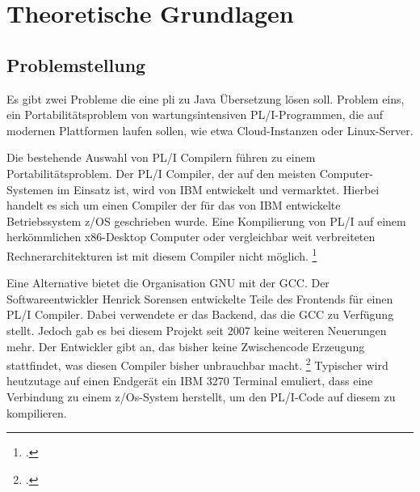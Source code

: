 




\section{Theoretische Grundlagen}
\subsection{Problemstellung}
	
Es gibt zwei Probleme die eine \ac{pli} zu Java Übersetzung lösen soll. 
Problem eins, ein Portabilitätsproblem von wartungsintensiven PL/I-Programmen, die auf modernen Plattformen laufen sollen, wie etwa Cloud-Instanzen oder Linux-Server.
	
Die bestehende Auswahl von PL/I Compilern führen zu einem Portabilitätsproblem. Der PL/I Compiler, der auf den meisten Computer-Systemen im Einsatz ist, wird von IBM entwickelt und vermarktet. Hierbei handelt es sich um einen Compiler der für das von IBM entwickelte Betriebssystem z/OS geschrieben wurde. Eine Kompilierung von PL/I auf einem herkömmlichen x86-Desktop Computer oder vergleichbar weit verbreiteten Rechnerarchitekturen ist mit diesem Compiler nicht möglich. \footcite[Vgl. ][]{plicomp}


Eine Alternative bietet die Organisation GNU mit der \ac{GCC}. Der Softwareentwickler Henrick Sorensen entwickelte Teile des Frontends für einen PL/I Compiler. Dabei verwendete er das Backend, das die \ac{GCC} zu Verfügung stellt. Jedoch gab es bei diesem Projekt seit 2007 keine weiteren Neuerungen mehr. Der Entwickler gibt an, das bisher keine Zwischencode Erzeugung stattfindet, was diesen Compiler bisher unbrauchbar macht. \footcite[Vgl. ][]{pligcc} 
Typischer wird heutzutage auf einen Endgerät ein IBM 3270 Terminal emuliert, dass eine Verbindung zu einem z/Os-System herstellt, um den PL/I-Code auf diesem zu kompilieren.

